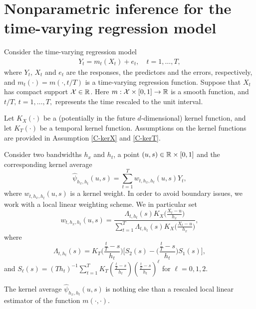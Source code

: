 \documentclass[a4paper,12pt]{article}
\begin{document}
\section{Nonparametric inference for the time-varying regression model}

Consider the time-varying regression model
\begin{align}\label{model}
Y_t = m_t(X_t) + e_t, \quad t = 1,\ldots, T,
\end{align}
where $Y_t$, $X_t$ and $e_t$ are the responses, the predictors and the errors, respectively, and $m_t(\cdot) = m(\cdot, t/T)$ is a time-varying regression function. Suppose that $X_t$ has compact support $\mathcal{X}\in \mathbb{R}$. Here $m: \mathcal{X}\times [0, 1] \rightarrow \mathbb{R} $ is a smooth function, and $t/T,\, t = 1,\ldots, T,$ represents the time rescaled to the unit interval.

Let $K_X(\cdot)$ be a (potentially in the future $d$-dimensional) kernel function, and let $K_T(\cdot)$ be a temporal kernel function. Assumptions on the kernel functions are provided in Assumption \ref{C-kerX} and \ref{C-kerT}.

Consider two bandwidths $h_x$ and $h_t$, a point $(u, s) \in \mathbb{R} \times [0, 1]$ and the corresponding kernel average
\begin{equation*}
\widehat{\psi}_{h_x, h_t}(u, s) = \sum\limits_{t=1}^T w_{t, h_x, h_t}(u, s)  Y_{t}, 
\end{equation*}
where $w_{t, h_x, h_t}(u, s)$ is a kernel weight. In order to avoid boundary issues, we work with a local linear weighting scheme. We in particular set 
\begin{equation}\label{weights}
w_{t, h_x, h_t}(u, s) = \frac{\Lambda_{t,h_t}(s)K_X\big(\frac{X_t-u}{h_x}\big) }{\sum\nolimits_{t=1}^T \Lambda_{t,h_t}(s) K_X\big(\frac{X_t-u}{h_x}\big)  }, 
\end{equation}
where
\[ \Lambda_{t,h_t}(s) = K_T\Big(\frac{\frac{t}{T}-s}{h_t}\Big) \bigg[ S_{2}(s) - \Big(\frac{\frac{t}{T}-s}{h_t}\Big) S_{1}(s) \bigg], \]
and $S_{\ell}(s) = (Th_t)^{-1} \sum\nolimits_{t=1}^T K_T(\frac{\frac{t}{T}-s}{h_t}) (\frac{\frac{t}{T}-s}{h_t})^\ell$ for $\ell = 0,1,2$.

The kernel average $\widehat{\psi}_{h_x, h_t}(u, s)$ is nothing else than a rescaled local linear estimator of the function $m(\cdot, \cdot)$.
\end{document}

